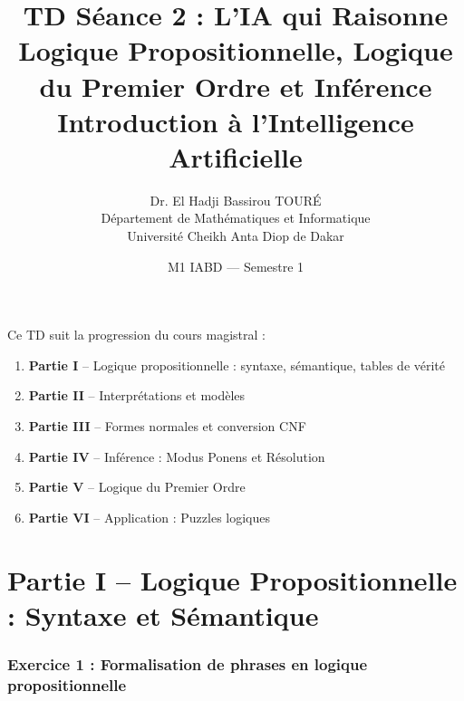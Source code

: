 \documentclass[11pt,a4paper]{article}
\title{\textbf{TD Séance 2 : L'IA qui Raisonne}\\
\Large Logique Propositionnelle, Logique du Premier Ordre et Inférence\\[0.3cm]
\normalsize Introduction à l'Intelligence Artificielle}
\author{Dr. El Hadji Bassirou TOURÉ\\
Département de Mathématiques et Informatique\\
Université Cheikh Anta Diop de Dakar}
\date{M1 IABD --- Semestre 1}
\begin{document}
\maketitle

\begin{rappelbox}[Structure du TD]
Ce TD suit la progression du cours magistral :
\begin{enumerate}
    \item \textbf{Partie I} -- Logique propositionnelle : syntaxe, sémantique, tables de vérité
    \item \textbf{Partie II} -- Interprétations et modèles
    \item \textbf{Partie III} -- Formes normales et conversion CNF
    \item \textbf{Partie IV} -- Inférence : Modus Ponens et Résolution
    \item \textbf{Partie V} -- Logique du Premier Ordre
    \item \textbf{Partie VI} -- Application : Puzzles logiques
\end{enumerate}
\end{rappelbox}

\part*{Partie I -- Logique Propositionnelle : Syntaxe et Sémantique}

\section*{Exercice 1 : Formalisation de phrases en logique propositionnelle}
\end{document}
